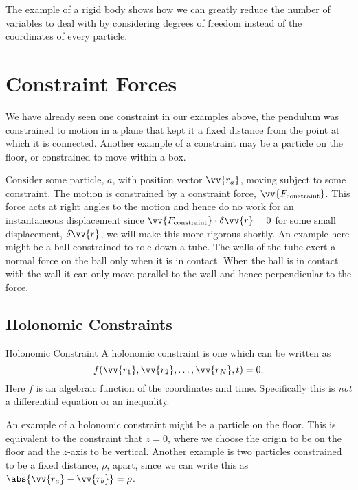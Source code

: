 \documentclass[fleqn]{NotesClass}
\newcommand*{\constraint}{\mathrm{constraint}}
\begin{document}
    The example of a rigid body shows how we can greatly reduce the number of variables to deal with by considering degrees of freedom instead of the coordinates of every particle.
    
    \section{Constraint Forces}
    We have already seen one constraint in our examples above, the pendulum was constrained to motion in a plane that kept it a fixed distance from the point at which it is connected.
    Another example of a constraint may be a particle on the floor, or constrained to move within a box.
    
    Consider some particle, \(a\), with position vector \(\vv{r_a}\), moving subject to some constraint.
    The motion is constrained by a constraint force, \(\vv{F_{\constraint}}\).
    This force acts at right angles to the motion and hence do no work for an instantaneous displacement since \(\vv{F_{\constraint}} \cdot \delta\vv{r} = 0\) for some small displacement, \(\delta\vv{r}\), we will make this more rigorous shortly.
    An example here might be a ball constrained to role down a tube.
    The walls of the tube exert a normal force on the ball only when it is in contact.
    When the ball is in contact with the wall it can only move parallel to the wall and hence perpendicular to the force.
    
    \subsection{Holonomic Constraints}
    \begin{dfn}{Holonomic Constraint}{}
        A holonomic constraint is one which can be written as
        \begin{equation}
            f(\vv{r_1}, \vv{r_2}, \dotsc, \vv{r_N}, t) = 0.
        \end{equation}
        Here \(f\) is an algebraic function of the coordinates and time.
        Specifically this is \emph{not} a differential equation or an inequality.
    \end{dfn}
    
    An example of a holonomic constraint might be a particle on the floor.
    This is equivalent to the constraint that \(z = 0\), where we choose the origin to be on the floor and the \(z\)-axis to be vertical.
    Another example is two particles constrained to be a fixed distance, \(\rho\), apart, since we can write this as \(\abs{\vv{r_a} - \vv{r_b}} = \rho\).
    
\end{document}
